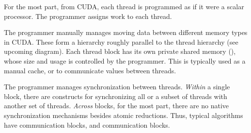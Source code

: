 \filbreak
{} For the most part, from CUDA, each thread is programmed as if it were a scalar processor.
  The programmer assigns work to each thread.

\filbreak
{} The programmer manually manages moving data between different memory types in CUDA.
    These form a hierarchy roughly parallel to the thread hierarchy (see upcoming diagram).
    Each thread block has its own private shared memory (), whose size and usage is controlled by the programmer.
    This is typically used as a manual cache, or to communicate values between threads.

\filbreak
{}
  The programmer manages synchronization between threads.
  \textit{Within} a single block, there are constructs for synchronizing all or a subset of threads with another set of threads.
  \textit{Across} blocks, for the most part, there are no native synchronization mechanisms besides atomic reductions.
  Thus, typical algorithms have  communication  blocks, and  communication  blocks.

